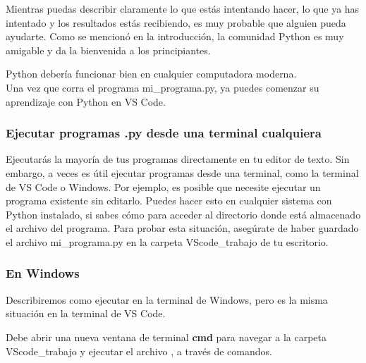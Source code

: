 Mientras puedas describir claramente lo que estás intentando hacer, lo que ya has intentado y los resultados
estás recibiendo, es muy probable que alguien pueda ayudarte. Como se mencionó en la introducción, la comunidad Python es muy amigable y
da la bienvenida a los principiantes.

Python debería funcionar bien en cualquier computadora moderna.\\




Una vez que corra el programa {\ttfamily\scriptsize  mi\_programa.py}, ya puedes comenzar su aprendizaje con Python en VS Code.  

\subsubsection{Ejecutar programas .py desde una terminal cualquiera}

Ejecutarás la mayoría de tus programas directamente en tu editor de texto. Sin embargo, a veces es útil 
ejecutar programas desde una terminal, como la terminal de VS Code o Windows. Por ejemplo, es posible que necesite  ejecutar un programa existente sin editarlo. 
Puedes hacer esto en cualquier sistema con Python instalado, si sabes cómo para acceder al directorio 
donde está almacenado el archivo del programa.  Para probar esta situación, asegúrate de haber guardado el archivo {\ttfamily  mi\_programa.py} en la carpeta {\ttfamily  VScode\_trabajo} de tu escritorio.


\subsubsection{En Windows}

Describiremos como ejecutar en la terminal de Windows, pero es la misma situación en la terminal de VS Code. 

Debe abrir una nueva ventana de terminal {\bf cmd} para navegar a la carpeta {\ttfamily VScode\_trabajo}  y  ejecutar el archivo {}, a través de comandos.   


